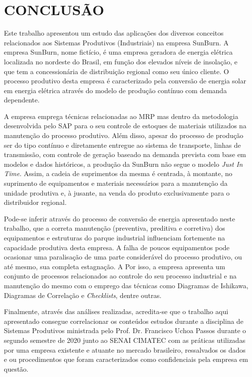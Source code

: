 \chapter{CONCLUSÃO}
\label{chap:conclusao}

Este trabalho apresentou um estudo das aplicações dos diversos conceitos relacionados aos Sistemas Produtivos (Industriais) na empresa SunBurn. A empresa SunBurn, nome fictício, é uma empresa geradora de energia elétrica localizada no nordeste do Brasil, em função dos elevados níveis de insolação, e que tem a concessionária de distribuição regional como seu único cliente. O processo produtivo desta empresa é caracterizado pela conversão de energia solar em energia elétrica através do modelo de produção contínuo com demanda dependente.

A empresa emprega técnicas relacionadas ao \ac{MRP} mas dentro da metodologia desenvolvida pelo \ac{SAP} para o seu controle de estoques de materiais utilizados na manutenção do processo produtivo. Além disso, apesar do processo de produção ser do tipo contínuo e diretamente entregue ao sistema de transporte, linhas de transmissão, com controle de geração baseado na demanda prevista com base em modelos e dados históricos, a produção da SunBurn não segue o modelo \textit{Just In Time}. Assim, a cadeia de suprimentos da mesma é centrada, à montante, no suprimento de equipamentos e materiais necessários para a manutenção da unidade produtiva e, à jusante, na venda do produto exclusivamente para o distribuidor regional.

Pode-se inferir através do processo de conversão de energia apresentado neste trabalho, que a correta manutenção (preventiva, preditiva e corretiva) dos equipamentos e estruturas do parque industrial influenciam fortemente na capacidade produtiva desta empresa. A falha de poucos equipamentos pode ocasionar uma paralisação de uma parte considerável do processo produtivo, ou até mesmo, sua completa estagnação. A Por isso, a empresa apresenta um conjunto de processos relacionados ao controle do seu processo industrial e na manutenção do mesmo com o emprego das técnicas como Diagramas de Ishikawa, Diagramas de Correlação e \textit{Checklists}, dentre outras.

Finalmente, através das análises realizadas, acredita-se que o trabalho aqui apresentado consegue correlacionar os conteúdos estudos durante a disciplina de Sistemas Produtivos ministrada pelo Prof. Dr. Francisco Uchoa Passos durante o segundo semestre de 2020 junto ao SENAI CIMATEC com as práticas utilizadas por uma empresa existente e atuante no mercado brasileiro, ressalvados os dados e ou procedimentos que foram caracterizados como confidenciais pela empresa em questão.